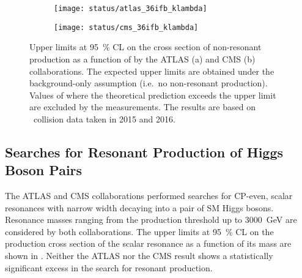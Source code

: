 \begin{figure}[htbp]
  \centering

  \begin{subfigure}[b]{0.9\textwidth}
    \centering

    \texttt{[image: status/atlas\_36ifb\_klambda]}


  \end{subfigure}

  \vspace{0.5em}

  \begin{subfigure}[b]{0.9\textwidth}
    \centering

    \texttt{[image: status/cms\_36ifb\_klambda]}

  \end{subfigure}

  \caption[Upper limits on the non-resonant \HH production cross section as a
  function of \klambda by the ATLAS and CMS collaborations based on
  \pp~collision data taken in 2015 and 2016]{Upper limits at \SI{95}{\percent}
    CL on the cross section of non-resonant \HH production as a function of
    \klambda by the ATLAS (a) and CMS (b) collaborations. The expected upper
    limits are obtained under the background-only assumption (i.e.\ no
    non-resonant \HH production). Values of \klambda where the theoretical
    prediction exceeds the upper limit are excluded by the measurements. The
    results are based on \pp~collision data taken in 2015 and 2016.}%
  \label{fig:prior_status_klambda}
\end{figure}


\subsection*{Searches for Resonant Production of Higgs Boson Pairs}%
\label{sec:past_results_resonant}

The ATLAS and CMS collaborations performed searches for CP-even, scalar
resonances with narrow width decaying into a pair of SM Higgs bosons. Resonance
masses ranging from the \HH production threshold up to \SI{3000}{\GeV} are
considered by both collaborations. The upper limits at \SI{95}{\percent} CL on
the production cross section of the scalar resonance as a function of its mass
are shown in . Neither the ATLAS nor the CMS result
shows a statistically significant excess in the search for resonant \HH
production.

